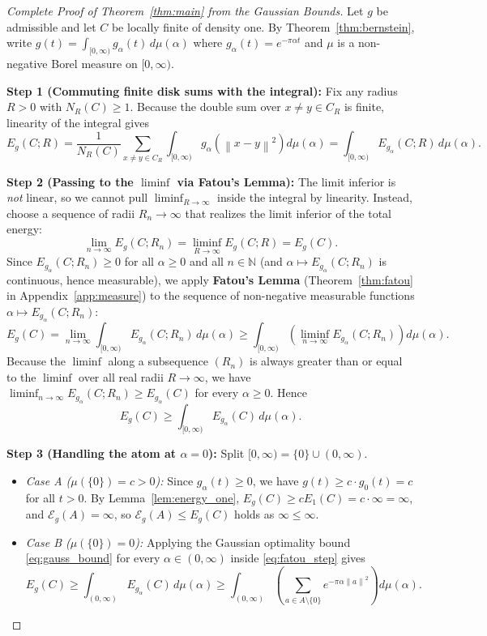 \documentclass[11pt, a4paper]{article}
\theoremstyle{definition}
\theoremstyle{remark}
\newcommand{\N}{\mathbb{N}}
\newcommand{\Ecal}{\mathcal{E}}
\newcommand{\norm}[1]{\left\lVert #1 \right\rVert}
\begin{document}
\begin{proof}[Complete Proof of Theorem~\ref{thm:main} from the Gaussian Bounds]
Let $g$ be admissible and let $C$ be locally finite of density one. By Theorem~\ref{thm:bernstein}, write $g(t) = \int_{[0, \infty)} g_\alpha(t) \, d\mu(\alpha)$ where $g_\alpha(t) = e^{-\pi \alpha t}$ and $\mu$ is a non-negative Borel measure on $[0, \infty)$.

\noindent \textbf{Step 1 (Commuting finite disk sums with the integral):} Fix any radius $R > 0$ with $N_R(C) \ge 1$. Because the double sum over $x \neq y \in C_R$ is finite, linearity of the integral gives
\[
E_g(C; R) = \frac{1}{N_R(C)} \sum_{x \neq y \in C_R} \int_{[0, \infty)} g_\alpha\left(\norm{x - y}^2\right) d\mu(\alpha) = \int_{[0, \infty)} E_{g_\alpha}(C; R) \, d\mu(\alpha).
\]

\noindent \textbf{Step 2 (Passing to the $\liminf$ via Fatou's Lemma):} The limit inferior is \textit{not} linear, so we cannot pull $\liminf_{R \to \infty}$ inside the integral by linearity. Instead, choose a sequence of radii $R_n \to \infty$ that realizes the limit inferior of the total energy:
\[
\lim_{n \to \infty} E_g(C; R_n) = \liminf_{R \to \infty} E_g(C; R) = E_g(C).
\]
Since $E_{g_\alpha}(C; R_n) \ge 0$ for all $\alpha \ge 0$ and all $n \in \N$ (and $\alpha \mapsto E_{g_\alpha}(C; R_n)$ is continuous, hence measurable), we apply \textbf{Fatou's Lemma} (Theorem~\ref{thm:fatou} in Appendix~\ref{app:measure}) to the sequence of non-negative measurable functions $\alpha \mapsto E_{g_\alpha}(C; R_n)$:
\[
E_g(C) = \lim_{n \to \infty} \int_{[0, \infty)} E_{g_\alpha}(C; R_n) \, d\mu(\alpha) \ge \int_{[0, \infty)} \left(\liminf_{n \to \infty} E_{g_\alpha}(C; R_n)\right) d\mu(\alpha).
\]
Because the $\liminf$ along a subsequence $(R_n)$ is always greater than or equal to the $\liminf$ over all real radii $R \to \infty$, we have $\liminf_{n \to \infty} E_{g_\alpha}(C; R_n) \ge E_{g_\alpha}(C)$ for every $\alpha \ge 0$. Hence
\begin{equation}
\label{eq:fatou_step}
E_g(C) \ge \int_{[0, \infty)} E_{g_\alpha}(C) \, d\mu(\alpha).
\end{equation}

\noindent \textbf{Step 3 (Handling the atom at $\alpha = 0$):} Split $[0, \infty) = \{0\} \cup (0, \infty)$.
\begin{itemize}
    \item \textit{Case A ($\mu(\{0\}) = c > 0$):} Since $g_\alpha(t) \ge 0$, we have $g(t) \ge c \cdot g_0(t) = c$ for all $t > 0$. By Lemma~\ref{lem:energy_one}, $E_g(C) \ge c E_1(C) = c \cdot \infty = \infty$, and $\Ecal_g(A) = \infty$, so $\Ecal_g(A) \le E_g(C)$ holds as $\infty \le \infty$.
    \item \textit{Case B ($\mu(\{0\}) = 0$):} Applying the Gaussian optimality bound \eqref{eq:gauss_bound} for every $\alpha \in (0, \infty)$ inside \eqref{eq:fatou_step} gives
    \[
    E_g(C) \ge \int_{(0, \infty)} E_{g_\alpha}(C) \, d\mu(\alpha) \ge \int_{(0, \infty)} \left( \sum_{a \in A \setminus \{0\}} e^{-\pi \alpha \norm{a}^2} \right) d\mu(\alpha).
    \]
\end{itemize}


\end{proof}
\end{document}
